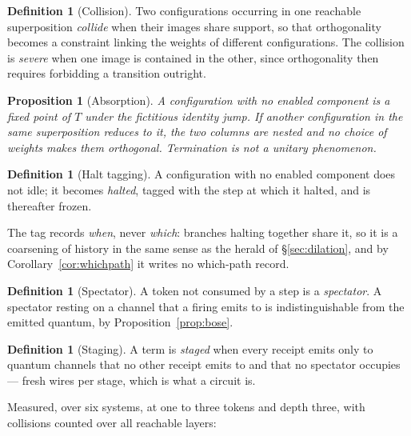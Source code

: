 \documentclass[11pt,a4paper]{article}
\theoremstyle{plain}
\newtheorem{proposition}[theorem]{Proposition}
\theoremstyle{definition}
\newtheorem{definition}[theorem]{Definition}
\theoremstyle{remark}
\begin{document}
\begin{definition}[Collision]\label{def:collision}
Two configurations occurring in one reachable superposition \emph{collide} when
their images share support, so that orthogonality becomes a constraint linking
the weights of different configurations. The collision is \emph{severe} when one
image is contained in the other, since orthogonality then requires forbidding a
transition outright.
\end{definition}

\begin{proposition}[Absorption]\label{prop:absorb}
A configuration with no enabled component is a fixed point of $T$ under the
fictitious identity jump. If another configuration in the same superposition
reduces to it, the two columns are nested and no choice of weights makes them
orthogonal. Termination is not a unitary phenomenon.
\end{proposition}

\begin{definition}[Halt tagging]\label{def:halt}
A configuration with no enabled component does not idle; it becomes
\emph{halted}, tagged with the step at which it halted, and is thereafter
frozen.
\end{definition}

The tag records \emph{when}, never \emph{which}: branches halting together share
it, so it is a coarsening of history in the same sense as the herald of
\S\ref{sec:dilation}, and by Corollary~\ref{cor:whichpath} it writes no
which-path record.

\begin{definition}[Spectator]\label{def:spectator}
A token not consumed by a step is a \emph{spectator}. A spectator resting on a
channel that a firing emits to is indistinguishable from the emitted quantum, by
Proposition~\ref{prop:bose}.
\end{definition}

\begin{definition}[Staging]\label{def:staging}
A term is \emph{staged} when every receipt emits only to quantum channels that
no other receipt emits to and that no spectator occupies --- fresh wires per
stage, which is what a circuit is.
\end{definition}

Measured, over six systems, at one to three tokens and depth three, with
collisions counted over all reachable layers:
\end{document}
